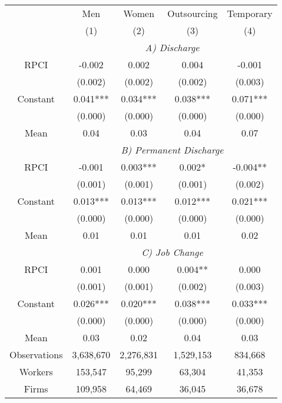 \begin{tabular}{ccccc}
\toprule
\toprule
      & Men   & Women & Outsourcing & Temporary \\
      & (1)   & (2)   & (3)   & (4) \\
\cmidrule{2-5}      & \multicolumn{4}{c}{\textit{A) Discharge}} \\
\midrule
RPCI  & -0.002 & 0.002 & 0.004 & -0.001 \\
      & (0.002) & (0.002) & (0.002) & (0.003) \\
Constant & 0.041*** & 0.034*** & 0.038*** & 0.071*** \\
      & (0.000) & (0.000) & (0.000) & (0.000) \\
Mean  & 0.04  & 0.03  & 0.04  & 0.07 \\
\cmidrule{2-5}      & \multicolumn{4}{c}{\textit{B) Permanent Discharge}} \\
\midrule
RPCI  & -0.001 & 0.003*** & 0.002* & -0.004** \\
      & (0.001) & (0.001) & (0.001) & (0.002) \\
Constant & 0.013*** & 0.013*** & 0.012*** & 0.021*** \\
      & (0.000) & (0.000) & (0.000) & (0.000) \\
Mean  & 0.01  & 0.01  & 0.01  & 0.02 \\
\cmidrule{2-5}      & \multicolumn{4}{c}{\textit{C) Job Change}} \\
\midrule
RPCI  & 0.001 & 0.000 & 0.004** & 0.000 \\
      & (0.001) & (0.001) & (0.002) & (0.003) \\
Constant & 0.026*** & 0.020*** & 0.038*** & 0.033*** \\
      & (0.000) & (0.000) & (0.000) & (0.000) \\
Mean  & 0.03  & 0.02  & 0.04  & 0.03 \\
\midrule
Observations & 3,638,670 & 2,276,831 & 1,529,153 & 834,668 \\
Workers & 153,547 & 95,299 & 63,304 & 41,353 \\
Firms & 109,958 & 64,469 & 36,045 & 36,678 \\
\bottomrule
\bottomrule
\end{tabular}%
